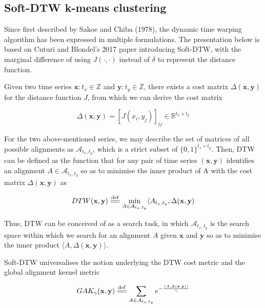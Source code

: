 \documentclass{article}
\newcommand{\eqdef}{\overset{\mathrm{def}}{=\joinrel=}}
\begin{document}

\subsection{Soft-DTW k-means clustering} %
\label{sub:soft_dtw_k_means_clustering}

Since first described by Sakoe and Chiba (1978),\cite{sakoe1978dynamic} the dynamic time warping algorithm has been expressed in multiple formulations. The presentation below is based on Cuturi and Blondel's 2017 paper introducing Soft-DTW, with the marginal difference of using $J(\cdot, \cdot)$ instead of $\delta$ to represent the distance function.\cite{cuturi2017soft} 

Given two time series $\mathbf{x}: t_x \in \mathbb{Z}$ and $\mathbf{y}: t_y \in \mathbb{Z}$, there exists a cost matrix $\Delta(\mathbf{x}, \mathbf{y})$ for the distance function $J$, from which we can derive the cost matrix 

\begin{equation}
	\Delta(\mathbf{x}, \mathbf{y}) = [J(x_i, y_j)]_{ij} \in \mathbb{R}^{t_x \times t_y} 
\end{equation}

For the two above-mentioned series, we may describe the set of matrices of all possible alignments as $\mathcal{A}_{t_x, t_y}$, which is a strict subset of $\{0, 1\}^{t_x \times t_y}$. Then, DTW can be defined as the function that for any pair of time series $(\mathbf{x}, \mathbf{y})$ identifies an alignment $A \in \mathcal{A}_{t_x, t_y}$ so as to minimise the inner product of A with the cost matrix $\Delta(\mathbf{x}, \mathbf{y})$ as

\begin{equation}
	DTW(\mathbf{x}, \mathbf{y}) \eqdef \min_{A \in \mathcal{A}_{t_x, t_y}} \langle A_{t_x, t_y}, \Delta(\mathbf{x}, \mathbf{y})
\end{equation}

Thus, DTW can be conceived of as a search task, in which $\mathcal{A}_{t_x, t_y}$ is the search space within which we search for an alignment $A$ given $\mathbf{x}$ and $\mathbf{y}$ so as to minimise the inner product $\langle A, \Delta(\mathbf{x}, \mathbf{y}) \rangle$. 

Soft-DTW universalises the notion underlying the DTW cost metric and the global alignment kernel metric

\begin{equation}
	GAK_{\gamma}(\mathbf{x}, \mathbf{y}) \eqdef \sum_{A \in \mathcal{A}_{t_x, t_y}} e^{- \frac{\langle A, \Delta(\mathbf{x}, \mathbf{y} \rangle)}{\gamma}}
	\label{eq:gak}
\end{equation}
\end{document}
